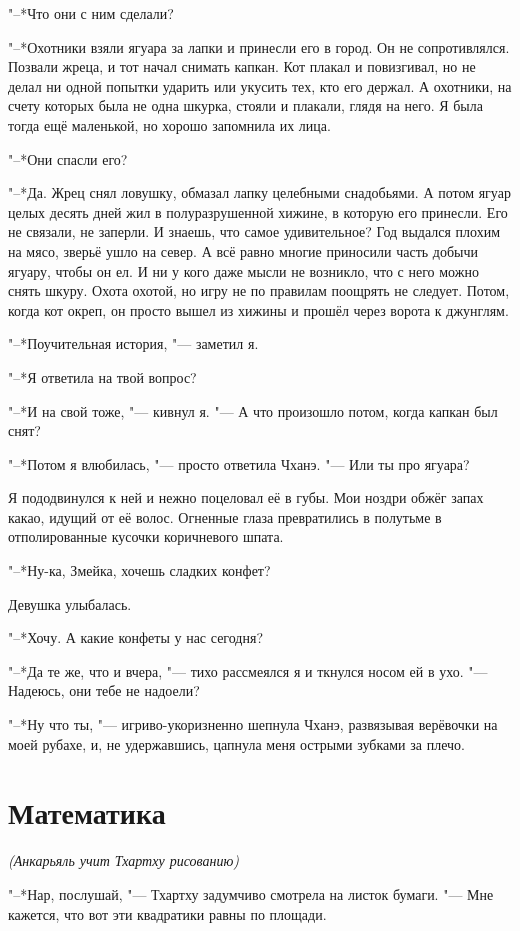 \documentclass[a4paper,10pt,fleqn]{book}
\begin{document}
"--*Что они с ним сделали?

"--*Охотники взяли ягуара за лапки и принесли его в город.
Он не сопротивлялся.
Позвали жреца, и тот начал снимать капкан.
Кот плакал и повизгивал, но не делал ни одной попытки ударить или укусить тех, кто его держал.
А охотники, на счету которых была не одна шкурка, стояли и плакали, глядя на него.
Я была тогда ещё маленькой, но хорошо запомнила их лица.

"--*Они спасли его?

"--*Да.
Жрец снял ловушку, обмазал лапку целебными снадобьями.
А потом ягуар целых десять дней жил в полуразрушенной хижине, в которую его принесли.
Его не связали, не заперли.
И знаешь, что самое удивительное?
Год выдался плохим на мясо, зверьё ушло на север.
А всё равно многие приносили часть добычи ягуару, чтобы он ел.
И ни у кого даже мысли не возникло, что с него можно снять шкуру.
Охота охотой, но игру не по правилам поощрять не следует.
Потом, когда кот окреп, он просто вышел из хижины и прошёл через ворота к джунглям.

"--*Поучительная история, "--- заметил я.

"--*Я ответила на твой вопрос?

"--*И на свой тоже, "--- кивнул я.
"--- А что произошло потом, когда капкан был снят?

"--*Потом я влюбилась, "--- просто ответила Чханэ.
"--- Или ты про ягуара?

Я пододвинулся к ней и нежно поцеловал её в губы.
Мои ноздри обжёг запах какао, идущий от её волос.
Огненные глаза превратились в полутьме в отполированные кусочки коричневого шпата.

"--*Ну-ка, Змейка, хочешь сладких конфет?

Девушка улыбалась.

"--*Хочу.
А какие конфеты у нас сегодня?

"--*Да те же, что и вчера, "--- тихо рассмеялся я и ткнулся носом ей в ухо.
"--- Надеюсь, они тебе не надоели?

"--*Ну что ты, "--- игриво-укоризненно шепнула Чханэ, развязывая верёвочки на моей рубахе, и, не удержавшись, цапнула меня острыми зубками за плечо.

\section{Математика}

\textit{(Анкарьяль учит Тхартху рисованию)}

"--*Нар, послушай, "--- Тхартху задумчиво смотрела на листок бумаги.
"--- Мне кажется, что вот эти квадратики равны по площади.
\end{document}
